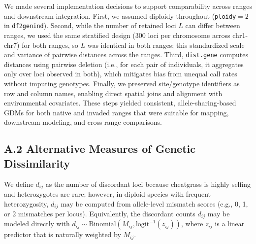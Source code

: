 \documentclass{article}
\begin{document}
We made several implementation decisions to support comparability across ranges and downstream integration. First, we assumed diploidy throughout (\texttt{ploidy}$=2$ in \texttt{df2genind}).
Second, while the number of retained loci $L$ can differ between ranges, we used the same stratified design (300 loci per chromosome across chr1-chr7) for both ranges, so $L$ was identical in both ranges; this standardized scale and variance of pairwise distances across the ranges. Third, \texttt{dist.gene} computes distances using pairwise deletion (i.e., for each pair of individuals, it aggregates only over loci observed in both), which mitigates bias from unequal call rates without imputing genotypes. Finally, we preserved site/genotype identifiers as row and column names, enabling direct spatial joins and alignment with environmental covariates. These steps yielded consistent, allele-sharing-based GDMs for both native and invaded ranges that were suitable for mapping, downstream modeling, and cross-range comparisons.


\subsection*{A.2 Alternative Measures of Genetic Dissimilarity}
We define $d_{ij}$ as the number of discordant loci because cheatgrass is highly selfing and heterozygotes are rare; however, in diploid species with frequent heterozygosity, $d_{ij}$ may be computed from allele-level mismatch scores (e.g., 0, 1, or 2 mismatches per locus). 
Equivalently, the discordant counts $d_{ij}$ may be modeled directly with $d_{ij}\sim\text{Binomial}(M_{ij},\text{logit}^{-1}(z_{ij}))$, where $z_{ij}$ is a linear predictor that is naturally weighted by $M_{ij}$.
\end{document}
